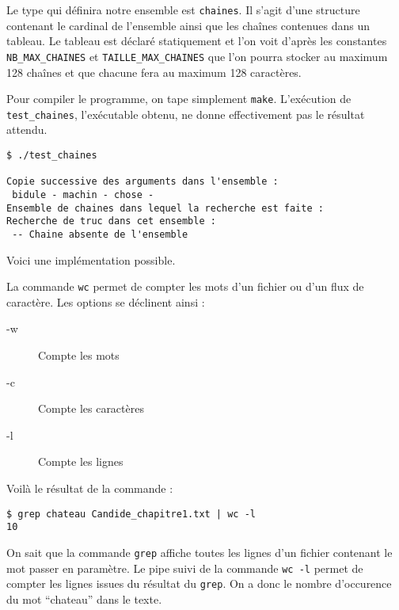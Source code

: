\documentclass[10pt]{article}
\begin{document}
\begin{enumerate}[label=\textbf{[\alph*]}]
  \setlength\itemsep{1em}

\item Le type qui définira notre ensemble est \texttt{chaines}. Il
  s'agit d'une structure contenant le cardinal de l'ensemble ainsi que
  les chaînes contenues dans un tableau. Le tableau est déclaré
  statiquement et l'on voit d'après les constantes
  \texttt{NB\_MAX\_CHAINES} et \texttt{TAILLE\_MAX\_CHAINES} que l'on
  pourra stocker au maximum 128 chaînes et que chacune fera au maximum
  128 caractères.

\item Pour compiler le programme, on tape simplement
  \texttt{make}. L'exécution de \texttt{test\_chaines}, l'exécutable
  obtenu, ne donne effectivement pas le résultat attendu.

\begin{verbatim}
$ ./test_chaines

Copie successive des arguments dans l'ensemble :
 bidule - machin - chose -
Ensemble de chaines dans lequel la recherche est faite :
Recherche de truc dans cet ensemble :
 -- Chaine absente de l'ensemble
\end{verbatim}

\item Voici une implémentation possible.

  

\item La commande \texttt{wc} permet de compter les mots d'un fichier
  ou d'un flux de caractère. Les options se déclinent ainsi :

  \begin{description}
  \item[-w] Compte les mots
  \item[-c] Compte les caractères
  \item[-l] Compte les lignes
  \end{description}

\item Voilà le résultat de la commande :

\begin{verbatim}
$ grep chateau Candide_chapitre1.txt | wc -l
10
\end{verbatim}

  On sait que la commande \texttt{grep} affiche toutes les lignes d'un
  fichier contenant le mot passer en paramètre. Le pipe suivi de la
  commande \texttt{wc -l} permet de compter les lignes issues du
  résultat du \texttt{grep}. On a donc le nombre d'occurence du mot
  ``chateau'' dans le texte.


\end{enumerate}
\end{document}
